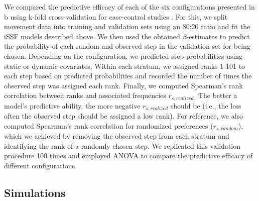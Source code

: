 \documentclass[abstract=on,10pt,a4paper,bibliography=totocnumbered]{article}
\begin{document}
We compared the predictive efficacy of each of the six configurations presented
in b using k-fold cross-validation for case-control
studies \citep{Fortin.2009}. For this, we split movement data into training and
validation sets using an 80:20 ratio and fit the iSSF models described above. We
then used the obtained $\beta$-estimates to predict the probability of each
random and observed step in the validation set for being chosen. Depending on
the configuration, we predicted step-probabilities using static or dynamic
covariates. Within each stratum, we assigned ranks 1-101 to each step based on
predicted probabilities and recorded the number of times the observed step was
assigned each rank. Finally, we computed Spearman's rank correlation between
ranks and associated frequencies $r_{s, realized}$. The better a model's
predictive ability, the more negative $r_{s, realized}$ should be (i.e., the
less often the observed step should be assigned a low rank). For reference, we
also computed Spearman's rank correlation for randomized preferences ($r_{s,
random}$), which we achieved by removing the observed step from each stratum and
identifying the rank of a randomly chosen step. We replicated this validation
procedure 100 times and employed ANOVA to compare the predictive efficacy of
different configurations.

\subsection{Simulations}
\end{document}
